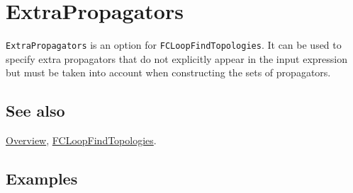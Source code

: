 \documentclass[../FeynCalcManual.tex]{subfiles}
\begin{document}
\hypertarget{extrapropagators}{
\section{ExtraPropagators}\label{extrapropagators}}

\texttt{ExtraPropagators} is an option for
\texttt{FCLoopFindTopologies}. It can be used to specify extra
propagators that do not explicitly appear in the input expression but
must be taken into account when constructing the sets of propagators.

\subsection{See also}

\hyperlink{toc}{Overview},
\hyperlink{fcloopfindtopologies}{FCLoopFindTopologies}.

\subsection{Examples}
\end{document}
